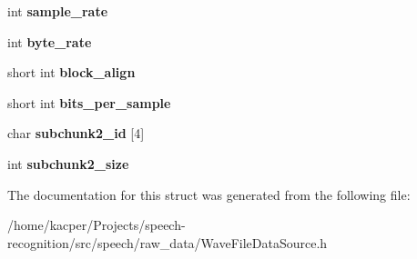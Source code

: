 \begin{DoxyCompactItemize}
\item 
\hypertarget{structspeech_1_1raw__data_1_1wav__header_a4aa3ed860c58f9f4021f2037c727992d}{int {\bfseries sample\+\_\+rate}}\label{structspeech_1_1raw__data_1_1wav__header_a4aa3ed860c58f9f4021f2037c727992d}

\item 
\hypertarget{structspeech_1_1raw__data_1_1wav__header_aff9c077868fcd513113c02928af0adef}{int {\bfseries byte\+\_\+rate}}\label{structspeech_1_1raw__data_1_1wav__header_aff9c077868fcd513113c02928af0adef}

\item 
\hypertarget{structspeech_1_1raw__data_1_1wav__header_aeebff7bdfe06c541bd49a7f2374c3d9d}{short int {\bfseries block\+\_\+align}}\label{structspeech_1_1raw__data_1_1wav__header_aeebff7bdfe06c541bd49a7f2374c3d9d}

\item 
\hypertarget{structspeech_1_1raw__data_1_1wav__header_a01a36c4ec5be08ff14472ab2bb8dcc92}{short int {\bfseries bits\+\_\+per\+\_\+sample}}\label{structspeech_1_1raw__data_1_1wav__header_a01a36c4ec5be08ff14472ab2bb8dcc92}

\item 
\hypertarget{structspeech_1_1raw__data_1_1wav__header_a4179f63d378c3b5e0796922ad6399a07}{char {\bfseries subchunk2\+\_\+id} \mbox{[}4\mbox{]}}\label{structspeech_1_1raw__data_1_1wav__header_a4179f63d378c3b5e0796922ad6399a07}

\item 
\hypertarget{structspeech_1_1raw__data_1_1wav__header_ab87a9319411457322b16134174d77545}{int {\bfseries subchunk2\+\_\+size}}\label{structspeech_1_1raw__data_1_1wav__header_ab87a9319411457322b16134174d77545}

\end{DoxyCompactItemize}


The documentation for this struct was generated from the following file\+:\begin{DoxyCompactItemize}
\item 
/home/kacper/\+Projects/speech-\/recognition/src/speech/raw\+\_\+data/Wave\+File\+Data\+Source.\+h\end{DoxyCompactItemize}
